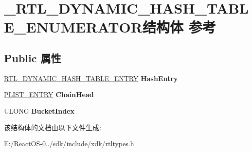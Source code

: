 \hypertarget{struct___r_t_l___d_y_n_a_m_i_c___h_a_s_h___t_a_b_l_e___e_n_u_m_e_r_a_t_o_r}{}\section{\+\_\+\+R\+T\+L\+\_\+\+D\+Y\+N\+A\+M\+I\+C\+\_\+\+H\+A\+S\+H\+\_\+\+T\+A\+B\+L\+E\+\_\+\+E\+N\+U\+M\+E\+R\+A\+T\+O\+R结构体 参考}
\label{struct___r_t_l___d_y_n_a_m_i_c___h_a_s_h___t_a_b_l_e___e_n_u_m_e_r_a_t_o_r}
\subsection*{Public 属性}
\begin{DoxyCompactItemize}
\item 
\mbox{\label{struct___r_t_l___d_y_n_a_m_i_c___h_a_s_h___t_a_b_l_e___e_n_u_m_e_r_a_t_o_r_a86831ad79756629ac497c3f94cff9cd2}} 
\hyperlink{struct___r_t_l___d_y_n_a_m_i_c___h_a_s_h___t_a_b_l_e___e_n_t_r_y}{R\+T\+L\+\_\+\+D\+Y\+N\+A\+M\+I\+C\+\_\+\+H\+A\+S\+H\+\_\+\+T\+A\+B\+L\+E\+\_\+\+E\+N\+T\+RY} {\bfseries Hash\+Entry}
\item 
\mbox{\label{struct___r_t_l___d_y_n_a_m_i_c___h_a_s_h___t_a_b_l_e___e_n_u_m_e_r_a_t_o_r_a1f821360a6aee5450ccd0555ecfc751b}} 
\hyperlink{struct___l_i_s_t___e_n_t_r_y}{P\+L\+I\+S\+T\+\_\+\+E\+N\+T\+RY} {\bfseries Chain\+Head}
\item 
\mbox{\label{struct___r_t_l___d_y_n_a_m_i_c___h_a_s_h___t_a_b_l_e___e_n_u_m_e_r_a_t_o_r_a7c015b7865ce3f88fa87737ddcee126a}} 
U\+L\+O\+NG {\bfseries Bucket\+Index}
\end{DoxyCompactItemize}


该结构体的文档由以下文件生成\+:\begin{DoxyCompactItemize}
\item 
E\+:/\+React\+O\+S-\/0../sdk/include/xdk/rtltypes.\+h\end{DoxyCompactItemize}
